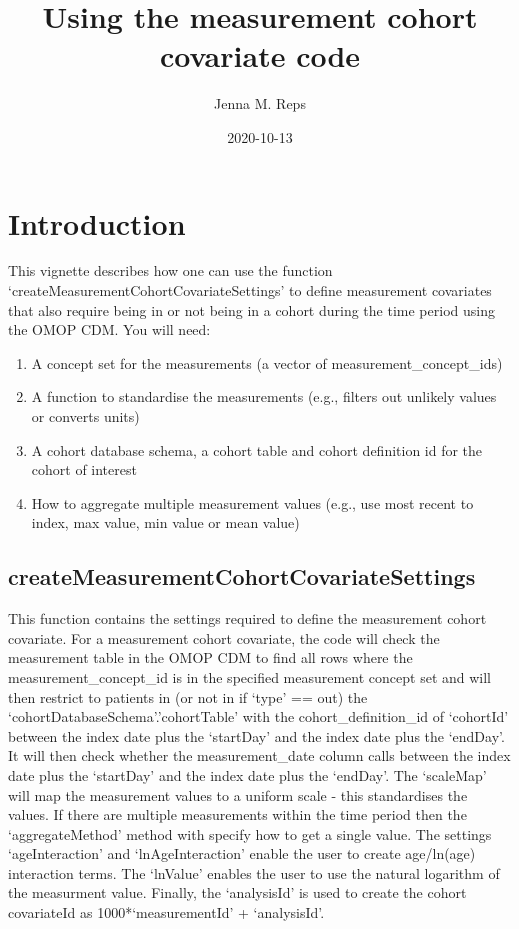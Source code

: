 \documentclass[
]{article}
\title{Using the measurement cohort covariate code}
\author{Jenna M. Reps}
\date{2020-10-13}
\providecommand{\tightlist}{%
  \setlength{\itemsep}{0pt}\setlength{\parskip}{0pt}}
\begin{document}
\maketitle

{
\setcounter{tocdepth}{2}
\tableofcontents
}
\hypertarget{introduction}{%
\section{Introduction}\label{introduction}}

This vignette describes how one can use the function
`createMeasurementCohortCovariateSettings' to define measurement
covariates that also require being in or not being in a cohort during
the time period using the OMOP CDM. You will need:

\begin{enumerate}
\def\labelenumi{\arabic{enumi}.}
\tightlist
\item
  A concept set for the measurements (a vector of
  measurement\_concept\_ids)
\item
  A function to standardise the measurements (e.g., filters out unlikely
  values or converts units)
\item
  A cohort database schema, a cohort table and cohort definition id for
  the cohort of interest
\item
  How to aggregate multiple measurement values (e.g., use most recent to
  index, max value, min value or mean value)
\end{enumerate}

\hypertarget{createmeasurementcohortcovariatesettings}{%
\subsection{createMeasurementCohortCovariateSettings}\label{createmeasurementcohortcovariatesettings}}

This function contains the settings required to define the measurement
cohort covariate. For a measurement cohort covariate, the code will
check the measurement table in the OMOP CDM to find all rows where the
measurement\_concept\_id is in the specified measurement concept set and
will then restrict to patients in (or not in if `type' == out) the
`cohortDatabaseSchema'.'cohortTable' with the cohort\_definition\_id of
`cohortId' between the index date plus the `startDay' and the index date
plus the `endDay'. It will then check whether the measurement\_date
column calls between the index date plus the `startDay' and the index
date plus the `endDay'. The `scaleMap' will map the measurement values
to a uniform scale - this standardises the values. If there are multiple
measurements within the time period then the `aggregateMethod' method
with specify how to get a single value. The settings `ageInteraction'
and `lnAgeInteraction' enable the user to create age/ln(age) interaction
terms. The `lnValue' enables the user to use the natural logarithm of
the measurment value. Finally, the `analysisId' is used to create the
cohort covariateId as 1000*`measurementId' + `analysisId'.
\end{document}
